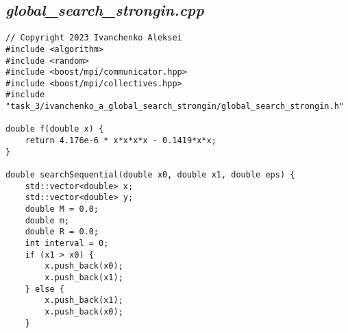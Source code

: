 \documentclass{article}
\begin{document}
\subsection*{\emph{global\_search\_strongin.cpp}}
\begin{lstlisting}
// Copyright 2023 Ivanchenko Aleksei
#include <algorithm>
#include <random>
#include <boost/mpi/communicator.hpp>
#include <boost/mpi/collectives.hpp>
#include "task_3/ivanchenko_a_global_search_strongin/global_search_strongin.h"

double f(double x) {
    return 4.176e-6 * x*x*x*x - 0.1419*x*x;
}

double searchSequential(double x0, double x1, double eps) {
    std::vector<double> x;
    std::vector<double> y;
    double M = 0.0;
    double m;
    double R = 0.0;
    int interval = 0;
    if (x1 > x0) {
        x.push_back(x0);
        x.push_back(x1);
    } else {
        x.push_back(x1);
        x.push_back(x0);
    }


\end{lstlisting}
\end{document}
